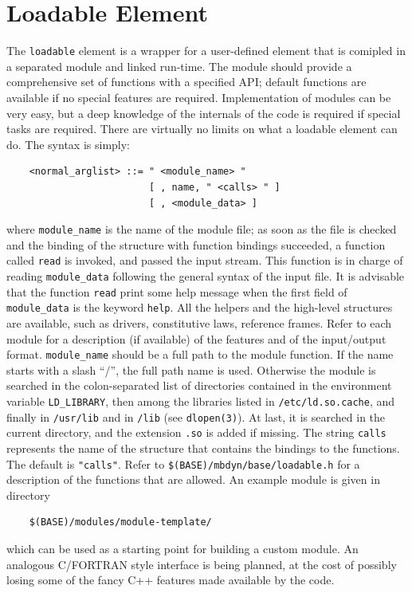 \documentclass[10pt,dvips]{report}
\begin{document}
\section{Loadable Element}
The {\tt loadable} element is a wrapper for a user-defined element that is
comipled in a separated module and linked run-time.
The module should provide a comprehensive set of functions with a specified
API; default functions are available if no special features are required.
Implementation of modules can be very easy, but a deep knowledge of the
internals of the code is required if special tasks are required. 
There are virtually no limits on what a loadable element can do.
The syntax is simply:
\begin{verbatim}
    <normal_arglist> ::= " <module_name> "
                         [ , name, " <calls> " ] 
                         [ , <module_data> ]
\end{verbatim}
where {\tt module\_name} is the name of the module file; as soon as the file
is checked and the binding of the structure with function bindings 
succeeded, a function called {\tt read} is invoked, and passed the input
stream.
This function is in charge of reading {\tt module\_data} following the
general syntax of the input file.
It is advisable that the function {\tt read} print some help message
when the first field of {\tt module\_data} is the keyword {\tt help}.
All the helpers and the high-level structures are available, such as
drivers, constitutive laws, reference frames.
Refer to each module for a description (if available) of the features and of
the input/output format.
{\tt module\_name} should be a full path to the module function.
If the name starts with a slash ``/'', the full path name is used.
Otherwise the module is searched in the colon-separated list of directories 
contained in the environment variable {\tt LD\_LIBRARY}, then among the
libraries listed in {\tt /etc/ld.so.cache}, and finally in
{\tt /usr/lib} and in {\tt /lib} (see {\tt dlopen(3)}).
At last, it is searched in the current directory, and the extension
{\tt .so} is added if missing.
The string {\tt calls} represents the name of the structure that contains
the bindings to the functions.
The default is {\tt "calls"}.
Refer to {\tt \$(BASE)/mbdyn/base/loadable.h} for a description of the
functions that are allowed.
An example module is given in directory
\begin{verbatim}
    $(BASE)/modules/module-template/
\end{verbatim}
which can be used as a starting point for building a custom module.
An analogous C/FORTRAN style interface is being planned, at the cost of
possibly losing some of the fancy C++ features made available by the code.
\end{document}
